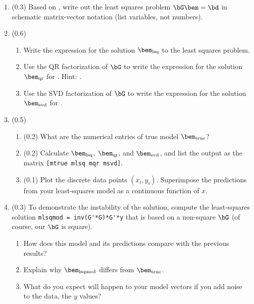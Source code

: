 \documentclass[11pt,titlepage,fleqn]{article}
\begin{document}
\begin{enumerate}
\item (0.3) Based on , write out the least squares problem $\bG\bem = \bd$ in schematic matrix-vector notation (list variables, not numbers).


\item (0.6) 

\begin{enumerate}
\item Write the expression for the solution $\bem_{\rm lsq}$ to the least squares problem.
\item Use the QR factorization of $\bG$ to write the expression for the solution $\bem_{\rm qr}$ for \makebox{$\bG\bem = \bd$}. Hint: \citet[][Appendix A]{AsterE2}.

\item Use the SVD factorization of $\bG$ to write the expression for the solution $\bem_{\rm svd}$ for \makebox{$\bG\bem = \bd$}.
\end{enumerate}

\item (0.5)

\begin{enumerate}
\item (0.2) What are the numerical entries of true model $\bem_{\rm true}$?
\item (0.2) Calculate $\bem_{\rm lsq}$, $\bem_{\rm qr}$, and $\bem_{\rm svd}$, and list the output as the matrix \verb+[mtrue mlsq mqr msvd]+.
\item (0.1) Plot the discrete data points $(x_i,y_i)$. Superimpose the predictions from your least-squares model as a continuous function of $x$.
\end{enumerate}


\item (0.3) To demonstrate the instability of the solution, compute the least-squares solution \verb+mlsqmod = inv(G'*G)*G'*y+ that is based on a non-square $\bG$ (of course, our $\bG$ is square).
%
\begin{enumerate}
\item How does this model and its predictions compare with the previous results?
\item Explain why $\bem_{\rm lsqmod}$ differs from $\bem_{\rm true}$.
\item What do you expect will happen to your model vectors if you add noise to the data, \ie the $y$ values?
\end{enumerate}

\end{enumerate}
\end{document}
